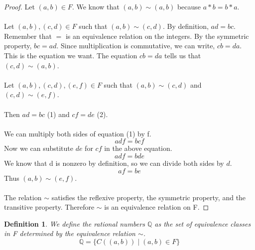 \documentclass{article}
\newtheorem{definition}{Definition}
\begin{document}
\begin{proof}
Let $(a, b) \in F$. We know that $(a, b) \sim (a, b)$ because $a * b = b * a$. 
\\
\\
Let $(a, b), (c, d) \in F$ such that $(a, b) \sim (c, d)$. By definition, $ad = bc$. Remember that $=$ is an equivalence relation on the integers. By the symmetric property, $bc = ad$. Since multiplication is commutative, we can write, $cb = da$. This is the equation we want. The equation $cb = da$ tells us that $(c, d) \sim (a, b)$. 
\\
\\
Let $(a, b), (c, d), (e, f) \in F$ such that $(a, b) \sim (c, d)$ and $(c, d) \sim (e, f)$. 
\\
\\
Then $ad = bc$ (1) and $cf = de$ (2). 
\\
\\
We can multiply both sides of equation (1) by f.
\begin{equation*}
adf = bcf
\end{equation*}
Now we can substitute $de$ for $cf$ in the above equation.
\begin{equation*}
adf = bde
\end{equation*}
We know that d is nonzero by definition, so we can divide both sides by $d$.
\begin{equation*}
af = be
\end{equation*}
Thus $(a, b) \sim (e, f)$. 
\\
\\
The relation $\sim$ satisfies the reflexive property, the symmetric property, and the transitive property. Therefore $\sim$ is an equivalence relation on F.
\end{proof}

\begin{definition}
We define the rational numbers $\mathbb{Q}$ as the set of equivalence classes in F determined by the equivalence relation $\sim$.
\begin{equation*}
\mathbb{Q} = \{C((a, b)) \mid (a, b) \in F\}
\end{equation*}
\end{definition}
\end{document}
